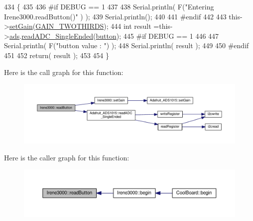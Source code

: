 \begin{DoxyCode}
434 \{
435 
436 \textcolor{preprocessor}{#if DEBUG == 1 }
437 
438     Serial.println( F(\textcolor{stringliteral}{"Entering Irene3000.readButton()"} ) );
439     Serial.println();
440 
441 \textcolor{preprocessor}{#endif }
442 
443     this->\hyperlink{class_irene3000_aff7c5da186b388e7272e63ff88a20c34}{setGain}(\hyperlink{_cool_adafruit___a_d_s1015_8h_a3d6c0e15829a207b9155890811fa4781a879d688347ec0bf159fe1278db602f68}{GAIN\_TWOTHIRDS});
444     \textcolor{keywordtype}{int} result =this->\hyperlink{class_irene3000_a1215e77ba761c9908d80d691f149e135}{ads}.\hyperlink{class_adafruit___a_d_s1015_a40f38b9e1f3ec397c0670dd632510235}{readADC\_SingleEnded}(\hyperlink{_irene3000_8h_a37976ee6fe1fb8546bfd6153b83ffa6c}{button});
445 \textcolor{preprocessor}{#if DEBUG == 1}
446     
447     Serial.println( F(\textcolor{stringliteral}{"button value : "}) );
448     Serial.println( result );
449 
450 \textcolor{preprocessor}{#endif }
451 
452     \textcolor{keywordflow}{return}( result );
453     
454 \}
\end{DoxyCode}
Here is the call graph for this function\+:\nopagebreak
\begin{figure}[H]
\begin{center}
\leavevmode
\includegraphics[width=350pt]{d6/d03/class_irene3000_a78a87eb7cf295b95c12b2ebd51c2bb77_cgraph}
\end{center}
\end{figure}
Here is the caller graph for this function\+:\nopagebreak
\begin{figure}[H]
\begin{center}
\leavevmode
\includegraphics[width=350pt]{d6/d03/class_irene3000_a78a87eb7cf295b95c12b2ebd51c2bb77_icgraph}
\end{center}
\end{figure}
\mbox{\label{class_irene3000_a436fc0a06681cd0784aba56b9707f19a}} 
